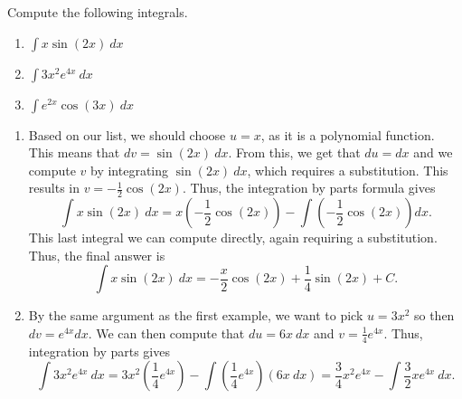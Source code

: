 \documentclass{ximera}
\begin{document}
\begin{example}
    Compute the following integrals.
    \begin{enumerate}
        \item $\int x\sin(2x)\ dx$
        \item $\int 3x^2e^{4x}\ dx$
        \item $\int e^{2x}\cos(3x)\ dx$
    \end{enumerate}
\end{example}

\begin{exampleSol}
    \begin{enumerate}
        \item Based on our list, we should choose $u = x$, as it is a polynomial function. This means that $dv = \sin(2x)\ dx$. From this, we get that $du = dx$ and we compute $v$ by integrating $\sin(2x)\ dx$, which requires a substitution. This results in $v = -\frac{1}{2}\cos(2x)$. Thus, the integration by parts formula gives
            \[ 
                \int x\sin(2x)\ dx = x \left(-\frac{1}{2}\cos(2x)\right) - \int \left(-\frac{1}{2}\cos(2x) \right) dx. 
            \] 
            This last integral we can compute directly, again requiring a substitution. Thus, the final answer is
            \[ 
                \int x\sin(2x)\ dx = -\frac{x}{2}\cos(2x) + \frac{1}{4}\sin(2x) + C. 
            \]
        \item By the same argument as the first example, we want to pick $u = 3x^2$ so then $dv = e^{4x} dx$. We can then compute that $du = 6x\ dx$ and $v = \frac{1}{4}e^{4x}$. Thus, integration by parts gives
            \[ 
                \int 3x^2e^{4x}\ dx = 3x^2\left(\frac{1}{4}e^{4x}\right) - \int \left(\frac{1}{4}e^{4x}\right) (6x \ dx) = \frac{3}{4}x^2e^{4x}- \int \frac{3}{2} xe^{4x}\ dx. 
            \]
            

\end{enumerate}
\end{exampleSol}
\end{document}
